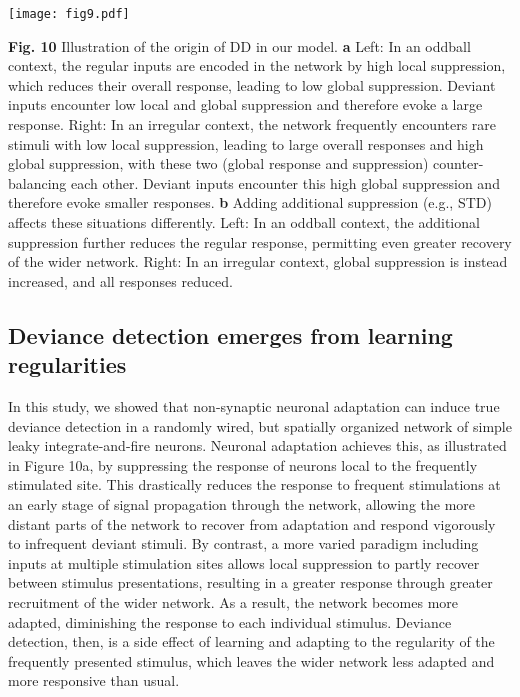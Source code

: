 \documentclass[pdflatex,referee,iicol,sn-basic]{sn-jnl}
\begin{document}
\begin{figure*}%
    \centering
    \texttt{[image: fig9.pdf]}
    \caption{}
    \label{fig9}
\end{figure*}
\textbf{Fig. 10} Illustration of the origin of DD in our model.
\textbf{a} Left: In an oddball context, the regular inputs are encoded in the network by high local suppression, which reduces their overall response, leading to low global suppression. Deviant inputs encounter low local and global suppression and therefore evoke a large response. Right: In an irregular context, the network frequently encounters rare stimuli with low local suppression, leading to large overall responses and high global suppression, with these two (global response and suppression) counter-balancing each other. Deviant inputs encounter this high global suppression and therefore evoke smaller responses.
\textbf{b} Adding additional suppression (e.g., STD) affects these situations differently. Left: In an oddball context, the additional suppression further reduces the regular response, permitting even greater recovery of the wider network. Right: In an irregular context, global suppression is instead increased, and all responses reduced.

\subsection{Deviance detection emerges from learning regularities}

In this study, we showed that non-synaptic neuronal adaptation can induce true deviance detection in a randomly wired, but spatially organized network of simple leaky integrate-and-fire neurons. Neuronal adaptation achieves this, as illustrated in Figure 10a, by suppressing the response of neurons local to the frequently stimulated site. This drastically reduces the response to frequent stimulations at an early stage of signal propagation through the network, allowing the more distant parts of the network to recover from adaptation and respond vigorously to infrequent deviant stimuli. By contrast, a more varied paradigm including inputs at multiple stimulation sites allows local suppression to partly recover between stimulus presentations, resulting in a greater response through greater recruitment of the wider network. As a result, the network becomes more adapted, diminishing the response to each individual stimulus. Deviance detection, then, is a side effect of learning and adapting to the regularity of the frequently presented stimulus, which leaves the wider network less adapted and more responsive than usual.
\end{document}
